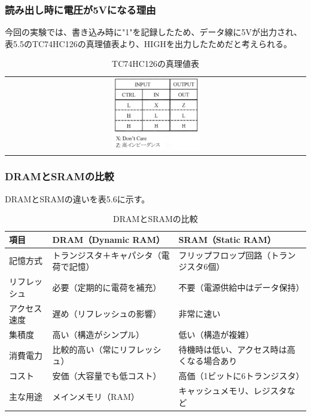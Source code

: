 \documentclass{jlreq}
\numberwithin{equation}{section}
\begin{document}
\subsubsection{読み出し時に電圧が5Vになる理由}
今回の実験では、書き込み時に"1"を記録したため、データ線に5Vが出力され、表5.5のTC74HC126の真理値表より、HIGHを出力したためだと考えられる。

\begin{table}[H]
  \centering
  \caption{TC74HC126の真理値表}
  \begin{tabular}{c}
    \includegraphics[width=0.3\textwidth]{assets/tc74hc126shinri.png} \\
  \end{tabular}
\end{table}

\subsubsection{DRAMとSRAMの比較}
DRAMとSRAMの違いを表5.6に示す。

\begin{table}[H]
  \centering
  \caption{DRAMとSRAMの比較}
  \begin{tabular}{|l|l|l|}
    \hline
    項目 & \textbf{DRAM（Dynamic RAM）} & \textbf{SRAM（Static RAM）} \\ \hline
    記憶方式 & トランジスタ＋キャパシタ（電荷で記憶） & フリップフロップ回路（トランジスタ6個） \\ \hline
    リフレッシュ & 必要（定期的に電荷を補充） & 不要（電源供給中はデータ保持） \\ \hline
    アクセス速度 & 遅め（リフレッシュの影響） & 非常に速い \\ \hline
    集積度 & 高い（構造がシンプル） & 低い（構造が複雑） \\ \hline
    消費電力 & 比較的高い（常にリフレッシュ） & 待機時は低い、アクセス時は高くなる場合あり \\ \hline
    コスト & 安価（大容量でも低コスト） & 高価（1ビットに6トランジスタ） \\ \hline
    主な用途 & メインメモリ（RAM） & キャッシュメモリ、レジスタなど \\ \hline
  \end{tabular}
\end{table}
\end{document}
